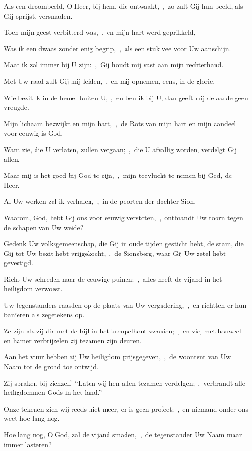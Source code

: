 \documentclass[12pt,twoside,a5paper]{article}
\begin{document}
\begin{halfparskip}
  Als een droombeeld, O Heer, bij hem, die ontwaakt,~\sep\ zo zult Gij hun beeld, als Gij oprijst, versmaden.

  Toen mijn geest verbitterd was,~\sep\ en mijn hart werd geprikkeld,

  Was ik een dwaas zonder enig begrip,~\sep\ als een stuk vee voor Uw aanschijn.

  Maar ik zal immer bij U zijn:~\sep\ Gij houdt mij vast aan mijn rechterhand.

  Met Uw raad zult Gij mij leiden,~\sep\ en mij opnemen, eens, in de glorie.

  Wie bezit ik in de hemel buiten U;~\sep\ en ben ik bij U, dan geeft mij de aarde geen vreugde.

  Mijn lichaam bezwijkt en mijn hart,~\sep\ de Rots van mijn hart en mijn aandeel voor eeuwig is God.

  Want zie, die U verlaten, zullen vergaan;~\sep\ die U afvallig worden, verdelgt Gij allen.

  Maar mij is het goed bij God te zijn,~\sep\ mijn toevlucht te nemen bij God, de Heer.

  Al Uw werken zal ik verhalen,~\sep\ in de poorten der dochter Sion.

   Waarom, God, hebt Gij ons voor eeuwig verstoten,~\sep\ ontbrandt Uw toorn tegen de schapen van Uw weide?

  Gedenk Uw volksgemeenschap, die Gij in oude tijden gesticht hebt, de stam, die Gij tot Uw bezit hebt vrijgekocht,~\sep\ de Sionsberg, waar Gij Uw zetel hebt gevestigd.

  Richt Uw schreden naar de eeuwige puinen:~\sep\ alles heeft de vijand in het heiligdom verwoest.

  Uw tegenstanders raasden op de plaats van Uw vergadering,~\sep\ en richtten er hun banieren als zegetekens op.

  Ze zijn als zij die met de bijl in het kreupelhout zwaaien;~\sep\ en zie, met houweel en hamer verbrijzelen zij tezamen zijn deuren.

  Aan het vuur hebben zij Uw heiligdom prijsgegeven,~\sep\ de woontent van Uw Naam tot de grond toe ontwijd.

  Zij spraken bij zichzelf: ``Laten wij hen allen tezamen verdelgen;~\sep\ verbrandt alle heiligdommen Gods in het land.''

  Onze tekenen zien wij reeds niet meer, er is geen profeet;~\sep\ en niemand onder ons weet hoe lang nog.

  Hoe lang nog, O God, zal de vijand smaden,~\sep\ de tegenstander Uw Naam maar immer lasteren?


\end{halfparskip}
\end{document}
